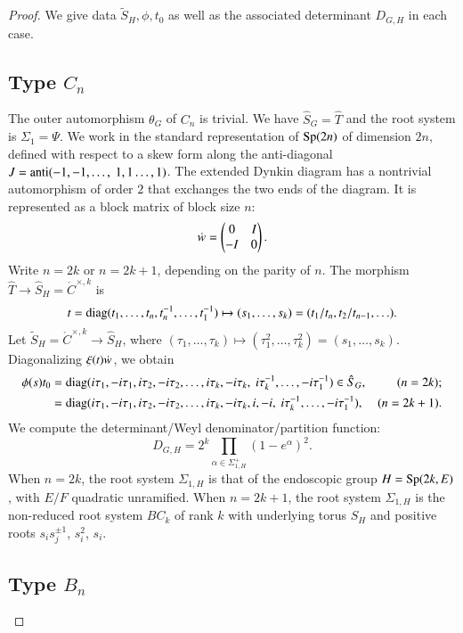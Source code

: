 \begin{proof}
We give data $\tilde S_H,\phi,t_0$ as well as the associated determinant $D_{G,H}$  in each case.

\subsection{Type $C_n$}

The outer automorphism $\theta_G$ of $C_n$ is trivial.  We have $\hat S_G = \hat T$ and the root system is $\Sigma_1 =\Psi$.
We work in the standard representation of ${\operatorname{Sp}}(2n)$ of dimension $2n$, defined with respect to a skew form 
along the anti-diagonal $J = {\operatorname{anti}}(-1,-1,\ldots,\ 1,1\ldots,1)$.  
The extended Dynkin diagram has a nontrivial automorphism of order $2$ that exchanges the two ends of the diagram.
It is represented as a block matrix of block size $n$:
\[
\dot w = \begin{pmatrix} 0 &I \\ -I & 0\end{pmatrix}.
\]
Write $n = 2k$ or $n = 2k+1$, depending on the parity of $n$.
The morphism $\hat T\to \hat S_H=\ring{C}^{\times,k}$ is 
\[
t = {\operatorname{diag}}(t_1,\ldots,t_n,t_n^{-1},\ldots,t_1^{-1})\mapsto (s_1,\ldots,s_k)=(t_1/t_n,t_2/t_{n-1},\ldots).
\]
Let $\tilde S_H=\ring{C}^{\times,k} \to \hat S_H$, where $(\tau_1,\ldots,\tau_k)\mapsto (\tau_1^2,\ldots,\tau_k^2) = (s_1,\ldots,s_k)$.
Diagonalizing $\xi(t)\dot w$, we obtain
\begin{align*}
\phi(s)t_0 &= \op{diag}(i \tau_1,-i\tau_1,i\tau_2,-i\tau_2,\ldots,i\tau_k,-i\tau_k,\ i\tau_k^{-1},\ldots, -i\tau_1^{-1})\in \hat S_G,& (n = 2k);\\
    &= \op{diag}(i \tau_1,-i\tau_1,i\tau_2,-i\tau_2,\ldots,i\tau_k,-i\tau_k,i,-i,\ i\tau_k^{-1},\ldots, -i\tau_1^{-1}),& (n = 2k+1).\\
\end{align*}
We compute the determinant/Weyl denominator/partition function:
\begin{equation}
D_{G,H} = 2^k\prod_{\alpha\in \Sigma^+_{1,H}} (1-e^\alpha)^2.
\end{equation}
When $n=2k$, the root system $\Sigma_{1,H}$ is that of the endoscopic group $H={\operatorname{Sp}}(2k,E)$, with $E/F$ quadratic unramified.
When $n=2k+1$, the root system $\Sigma_{1,H}$ is the non-reduced root system $BC_k$ of rank $k$ with underlying torus $\hat S_H$
and positive roots $s_i s_j^{\pm 1}$, $s_i^2$, $s_i$.

\subsection{Type $B_n$}


\end{proof}
